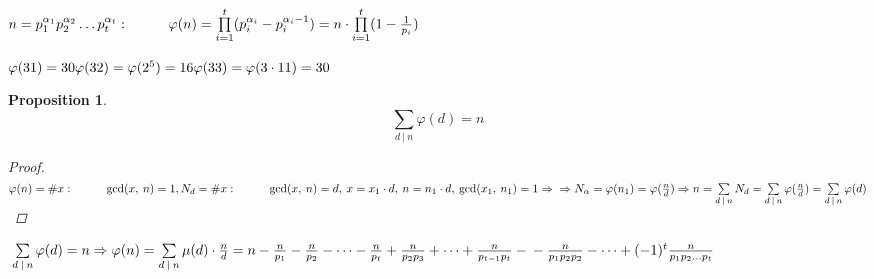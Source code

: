 \documentclass[a4paper,12pt]{bookest}
\newtheorem*{prop*}{Proposition}
\newcommand\tab[1][1cm]{\hspace*{#1}}
\begin{document}
$n=p^{\alpha_1}_1p^{\alpha_2}_2\dots p^{\alpha_t}_t:\tab \varphi(n)=\prod\limits_{i=1}^{t}(p^{\alpha_i}_i-p^{\alpha_i-1}_i)=n\cdot\prod\limits_{i=1}^{t}(1-\frac{1}{p_i})$
\begin{example}
$\varphi(31)=30\\\varphi(32)=\varphi(2^5)=16\\\varphi(33)=\varphi(3\cdot 11)=30$	
\end{example}
\begin{prop*}
$$\sum\limits_{d\>|\>n}\varphi(d)=n$$
\begin{proof}
	$\\\varphi(n)=\# x:\tab\gcd(x,\>n)=1,\\ N_d=\# x:\tab\gcd(x,\>n)=d,\>x=x_1\cdot d,\>n=n_1\cdot d,\>\gcd(x_1,\>n_1)=1\Rightarrow\\\Rightarrow N_\alpha=\varphi(n_1)=\varphi(\frac nd)\Rightarrow n=\sum\limits_{d\>|\>n}N_d=\sum\limits_{d\>|\>n}\varphi(\frac nd)=\sum\limits_{d\>|\>n}\varphi(d)$
\end{proof}	
\end{prop*}
$\\\sum\limits_{d\>|\>n}\varphi(d)=n\Rightarrow\varphi(n)=\sum\limits_{d\>|\>n}\mu(d)\cdot\frac nd=n-\frac n{p_1}-\frac n{p_2}-\dots-\frac n{p_t}+\frac n{p_2p_3}+\dots+\frac n{p_{t-1}p_t}-\\-\frac n{p_1p_2p_2}-\dots+(-1)^t\frac n{p_1p_2\dots p_t}$
\end{document}
